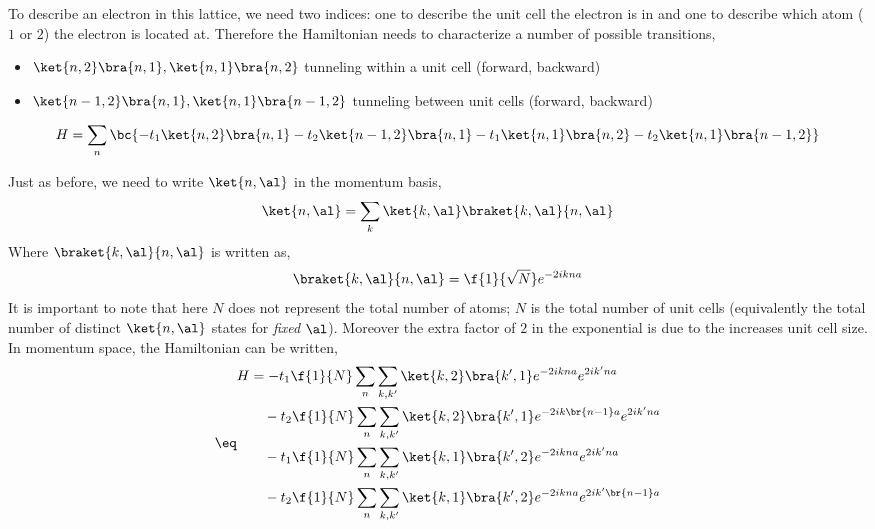 \documentclass{article}
\begin{document}
To describe an electron in this lattice, we need two indices: one to describe the unit cell the electron is in and one to describe which atom ($1$ or $2$) the electron is located at. Therefore the Hamiltonian needs to characterize a number of possible transitions,
\begin{itemize}
    \item $\ket{n, 2} \bra{n, 1}, \ket{n, 1} \bra{n, 2}$ tunneling within a unit cell (forward, backward)
    \item $\ket{n-1, 2} \bra{n, 1}, \ket{n, 1} \bra{n-1, 2}$ tunneling between unit cells (forward, backward)
\end{itemize}

\[ H = \sum_{n} \bc{ - t_1 \ket{n, 2} \bra{n, 1} - t_2 \ket{n-1, 2} \bra{n, 1} - t_1 \ket{n, 1} \bra{n, 2} - t_2 \ket{n, 1} \bra{n-1, 2}} \]

Just as before, we need to write $\ket{n, \al}$ in the momentum basis,
\[ \ket{n, \al} = \sum_{k} \ket{k,\al} \braket{k, \al}{n, \al} \]
Where $\braket{k, \al}{n, \al}$ is written as,
\[ \braket{k, \al}{n, \al} = \f{1}{\sqrt{N}} e^{- 2 i k n a} \]
It is important to note that here $N$ does not represent the total number of atoms; $N$ is the total number of unit cells (equivalently the total number of distinct $\ket{n, \al}$ states for \textit{fixed} $\al$). Moreover the extra factor of $2$ in the exponential is due to the increases unit cell size. In momentum space, the Hamiltonian can be written,
\begin{align*}
\eq \label{eq:H_polyacetylene}
\begin{split}
H
&= - t_1 \f{1}{N} \sum_{n} \sum_{k ,k'} \ket{k, 2}\bra{k', 1} e^{-2ikna}e^{2ik'na} \\
&\quad  - t_2 \f{1}{N} \sum_{n} \sum_{k ,k'} \ket{k, 2}\bra{k', 1} e^{-2ik\br{n-1}a}e^{2ik'na} \\
&\quad  - t_1 \f{1}{N} \sum_{n} \sum_{k ,k'} \ket{k, 1}\bra{k', 2} e^{-2ikna}e^{2ik'na} \\
&\quad  - t_2 \f{1}{N} \sum_{n} \sum_{k ,k'} \ket{k, 1}\bra{k', 2} e^{-2ikna}e^{2ik'\br{n-1}a}
\end{split}
\end{align*}
\end{document}
